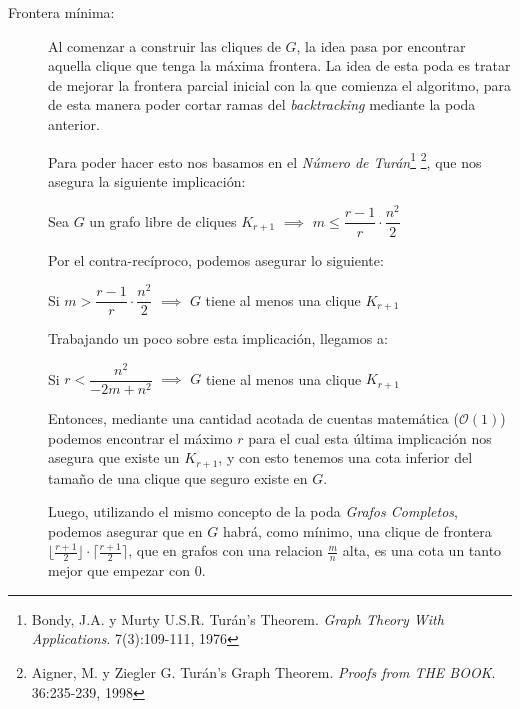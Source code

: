 \begin{description}
    \item[Frontera m\'inima: ] Al comenzar a construir las cliques de $G$, la idea pasa
        por encontrar aquella clique que tenga la m\'axima frontera. La idea de esta
        poda es tratar de mejorar la frontera parcial inicial con la que comienza el
        algoritmo, para de esta manera poder cortar ramas del \emph{backtracking} mediante
        la poda anterior.

        \par Para poder hacer esto nos basamos en el \emph{N\'umero de Tur\'an}\footnote{%
            Bondy, J.A. y Murty U.S.R. Tur\'an's Theorem. \emph{Graph Theory With Applications}.
            7(3):109-111, 1976} \footnote{%
            Aigner, M. y Ziegler G. Tur\'an's Graph Theorem. \emph{Proofs from THE BOOK}.
            36:235-239, 1998}, que nos asegura la siguiente implicaci\'on:

        \par Sea $G$ un grafo libre de cliques $K_{r+1}$ $\implies$
            $m \leq \dfrac{r-1}{r}\cdot\dfrac{n^2}{2}$
        \bigskip

        \par Por el contra-rec\'iproco, podemos asegurar lo siguiente:
        \par Si $m > \dfrac{r-1}{r}\cdot\dfrac{n^2}{2}$ $\implies$
            $G$ tiene al menos una clique $K_{r+1}$ 
        \bigskip

        \par Trabajando un poco sobre esta implicaci\'on, llegamos a:
        \par Si $r < \dfrac{n^2}{-2m + n^2}$ $\implies$
            $G$ tiene al menos una clique $K_{r+1}$
        \bigskip

        \par Entonces, mediante una cantidad acotada de cuentas matem\'atica ($\mathcal O(1)$)
            podemos encontrar el m\'aximo $r$ para el cual esta \'ultima implicaci\'on nos
            asegura que existe un $K_{r+1}$, y con esto tenemos una cota inferior del tama\~no
            de una clique que seguro existe en $G$.

            \par Luego, utilizando el mismo concepto de la poda \emph{Grafos Completos}, podemos
            asegurar que en $G$ habr\'a, como m\'inimo, una clique de frontera
            $\lfloor\frac{r+1}{2}\rfloor \cdot \lceil\frac{r+1}{2}\rceil$, que en grafos con una
            relacion $\frac{m}{n}$ alta, es una cota un tanto mejor que empezar con 0.


\end{description}
